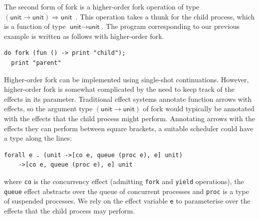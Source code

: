 \documentclass[sigplan, nonacm, natbib = false, review, screen]{acmart}
\begin{document}
The second form of fork is a higher-order fork operation of type
$(\textsf{unit} \to \textsf{unit}) \Rightarrow
\textsf{unit}$~\cite{dolan2015effective, ocamleffect2021}.
%
This operation takes a thunk for the child process, which is a
function of type $\textsf{unit}\to\textsf{unit}$.
%
The program corresponding to our previous example is written as
follows with higher-order fork.
\begin{lstlisting}[style=metl]
  do fork (fun () -> print "child");
  print "parent"
\end{lstlisting}

Higher-order fork can be implemented using single-shot
continuations.
%
%
%
However, higher-order fork is somewhat complicated by the need to keep
track of the effects in its parameter.
%
%
Traditional effect systems annotate function arrows with effects, so the
argument type $(\textsf{unit} \to \textsf{unit})$ of \textsf{fork} would
typically be annotated with the effects that the child process might
perform. Annotating arrows with the effects they can perform between square
brackets, a suitable scheduler could have a type along the lines:
\begin{lstlisting}[style=metl]
  forall e . (unit ->[co e, queue (proc e), e] unit)
    ->[co e, queue (proc e), e] unit
\end{lstlisting}
%
where \lstinline[style=metl]{co} is the concurrency effect (admitting
\lstinline[style=metl]{fork} and \lstinline[style=metl]{yield}
operations), the \lstinline[style=metl]{queue} effect abstracts over
the queue of concurrent processes and \lstinline[style=metl]{proc} is
a type of suspended processes.
%
We rely on the effect variable \lstinline[style=metl]{e} to
parameterise over the effects that the child process may perform.
\end{document}
